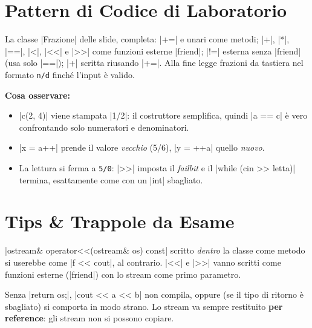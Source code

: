 \section{Pattern di Codice di Laboratorio}

La classe \cc|Frazione| delle slide, completa: \cc|+=| e unari come metodi;
\cc|+|, \cc|*|, \cc|==|, \cc|<|, \cc|<<| e \cc|>>| come funzioni esterne \cc|friend|;
\cc|!=| esterna senza \cc|friend| (usa solo \cc|==|); \cc|+| scritta riusando
\cc|+=|. Alla fine legge frazioni da tastiera nel formato \texttt{n/d} finché l'input è valido.


\textbf{Cosa osservare:}
\begin{itemize}
  \item \cc|c(2, 4)| viene stampata \cc|1/2|: il costruttore semplifica, quindi
        \cc|a == c| è vero confrontando solo numeratori e denominatori.
  \item \cc|x = a++| prende il valore \emph{vecchio} (5/6), \cc|y = ++a| quello
        \emph{nuovo}.
  \item La lettura si ferma a \texttt{5/0}: \cc|>>| imposta il \emph{failbit} e il
        \cc|while (cin >> letta)| termina, esattamente come con un \cc|int| sbagliato.
\end{itemize}

\section{Tips \& Trappole da Esame}

\begin{trappola}
\cc|ostream& operator<<(ostream& os) const| scritto \emph{dentro} la classe come metodo
si userebbe come \cc|f << cout|, al contrario. \cc|<<| e \cc|>>| vanno scritti come
funzioni esterne (\cc|friend|) con lo stream come primo parametro.
\end{trappola}

\begin{trappola}
Senza \cc|return os;|, \cc|cout << a << b| non compila, oppure (se il tipo di ritorno è
sbagliato) si comporta in modo strano. Lo stream va sempre restituito \textbf{per
reference}: gli stream non si possono copiare.
\end{trappola}

